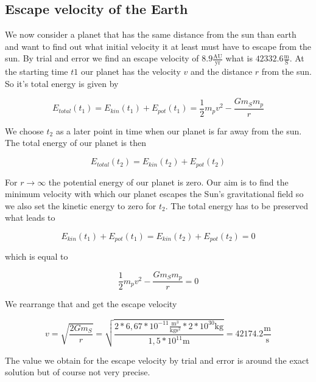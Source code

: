 \documentclass[11pt,a4wide]{article}
\begin{document}
\subsection{Escape velocity of the Earth}
We now consider a planet that has the same distance from the sun than earth and want to find out what initial velocity it at least must have to escape from the sun. By trial and error we find an escape velocity of $8.9\frac{\text{AU}}{\text{yr}}$ what is $42332.6\frac{\text{m}}{\text{S}}$. At the starting time $t1$ our planet has the velocity $v$ and the distance $r$ from the sun. So it's total energy is given by

\begin{equation}
E_{total}\left(t_1\right) = E_{kin}\left(t_1\right) + E_{pot}\left(t_1\right) = \frac{1}{2}m_{p}v^2 - \frac{Gm_{S}m_{p}}{r}
\end{equation}

We choose $t_2$ as a later point in time when our planet is far away from the sun. The total energy of our planet is then

\begin{equation}
E_{total}\left(t_2\right) = E_{kin}\left(t_2\right) + E_{pot}\left(t_2\right) 
\end{equation}

For $r\rightarrow\infty$ the potential energy of our planet is zero. Our aim is to find the minimum velocity with which our planet escapes the Sun's gravitational field so we also set the kinetic energy to zero for $t_2$. The total energy has to be preserved what leads to

\begin{equation}
E_{kin}\left(t_1\right) + E_{pot}\left(t_1\right) = E_{kin}\left(t_2\right) + E_{pot}\left(t_2\right) = 0
\end{equation}

which is equal to 

\begin{equation}
\frac{1}{2}m_{p}v^2 - \frac{Gm_{S}m_{p}}{r} = 0
\end{equation}

We rearrange that and get the escape velocity

\begin{equation} 
v=\sqrt{\frac{2Gm_{S}}{r}}=\sqrt{\frac{2*6,67*10^{-11}\frac{\text{m}^3}{\text{kg}\text{s}^2}*2*10^{30}\text{kg}}{1,5*10^{11}\text{m}}}=42174.2\frac{\text{m}}{\text{s}}
\end{equation}

The value we obtain for the escape velocity by trial and error is around the exact solution but of course not very precise.  
\end{document}
